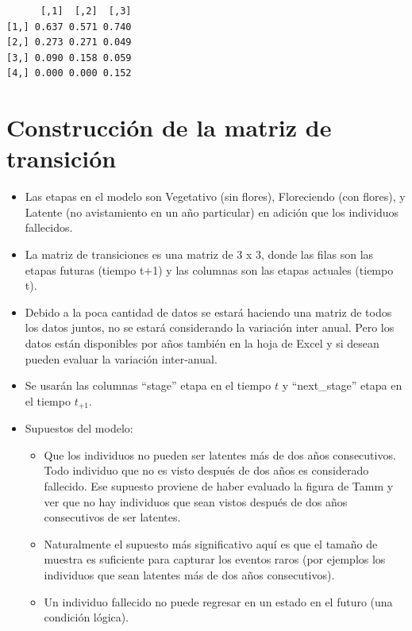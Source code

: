 \documentclass[
  12pt,
  letterpaper,
]{book}
\providecommand{\tightlist}{%
  \setlength{\itemsep}{0pt}\setlength{\parskip}{0pt}}\usepackage{longtable,booktabs,array}
\begin{document}
\begin{verbatim}
      [,1]  [,2]  [,3]
[1,] 0.637 0.571 0.740
[2,] 0.273 0.271 0.049
[3,] 0.090 0.158 0.059
[4,] 0.000 0.000 0.152
\end{verbatim}

\section{Construcción de la matriz de
transición}\label{construcciuxf3n-de-la-matriz-de-transiciuxf3n}

\begin{itemize}
\item
  Las etapas en el modelo son Vegetativo (sin flores), Floreciendo (con
  flores), y Latente (no avistamiento en un año particular) en adición
  que los individuos fallecidos.
\item
  La matriz de transiciones es una matriz de 3 x 3, donde las filas son
  las etapas futuras (tiempo t+1) y las columnas son las etapas actuales
  (tiempo t).
\item
  Debido a la poca cantidad de datos se estará haciendo una matriz de
  todos los datos juntos, no se estará considerando la variación inter
  anual. Pero los datos están disponibles por años también en la hoja de
  Excel y si desean pueden evaluar la variación inter-anual.
\item
  Se usarán las columnas ``stage'' etapa en el tiempo \(t\) y
  ``next\_stage'' etapa en el tiempo \(t_{+1}\).
\item
  Supuestos del modelo:

  \begin{itemize}
  \tightlist
  \item
    Que los individuos no pueden ser latentes más de dos años
    consecutivos. Todo individuo que no es visto después de dos años es
    considerado fallecido. Ese supuesto proviene de haber evaluado la
    figura de Tamm y ver que no hay individuos que sean vistos después
    de dos años consecutivos de ser latentes.
  \item
    Naturalmente el supuesto más significativo aquí es que el tamaño de
    muestra es suficiente para capturar los eventos raros (por ejemplos
    los individuos que sean latentes más de dos años consecutivos).
  \item
    Un individuo fallecido no puede regresar en un estado en el futuro
    (una condición lógica).
  \end{itemize}
\end{itemize}
\end{document}
